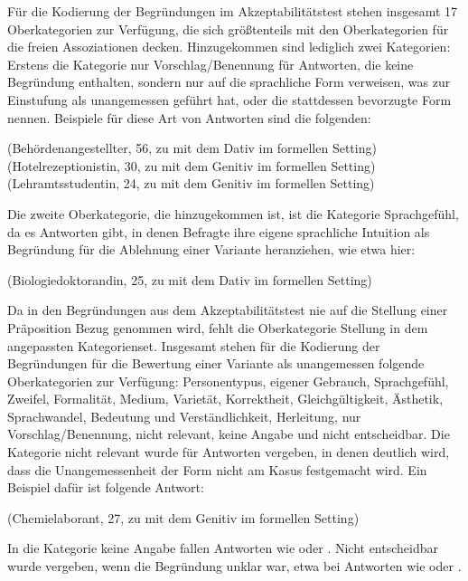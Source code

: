 Für die Kodierung der Begründungen im Akzeptabilitätstest stehen insgesamt 17 Oberkategorien zur Verfügung, die sich größtenteils mit den Oberkategorien für die freien Assoziationen decken. 
Hinzugekommen sind lediglich zwei Kategorien:
Erstens die Kategorie \glqq nur Vorschlag/Benennung\grqq{} für Antworten, die keine Begründung enthalten, sondern nur auf die sprachliche Form verweisen, was zur Einstufung als unangemessen geführt hat, oder die stattdessen bevorzugte Form nennen. 
Beispiele für diese Art von Antworten sind die folgenden: 
\begin{exe}
\ex {} (Behördenangestellter, 56, zu \waehrend{} mit dem Dativ im formellen Setting)
\ex {} (Hotelrezeptionistin, 30, zu \dank{} mit dem Genitiv im formellen Setting)
\ex {} (Lehramtsstudentin, 24, zu \gegenueber{} mit dem Genitiv im formellen Setting)
\end{exe}
Die zweite Oberkategorie, die hinzugekommen ist, ist die Kategorie \glqq Sprachgefühl\grqq, da es Antworten gibt, in denen Befragte ihre eigene sprachliche Intuition als Begründung für die Ablehnung einer Variante heranziehen, wie etwa hier:
\begin{exe}
\ex {} (Biologiedoktorandin, 25, zu \waehrend{} mit dem Dativ im formellen Setting)
\end{exe}
Da in den Begründungen aus dem Akzeptabilitätstest nie auf die Stellung einer Präposition Bezug genommen wird, fehlt die Oberkategorie \glqq Stellung\grqq{} in dem angepassten Kategorienset. 
Insgesamt stehen für die Kodierung der Begründungen für die Bewertung einer Variante als unangemessen folgende Oberkategorien zur Verfügung: \glqq Personentypus\grqq, \glqq eigener Gebrauch\grqq, \glqq Sprachgefühl\grqq, \glqq Zweifel\grqq, \glqq Formalität\grqq, \glqq Medium\grqq, \glqq Varietät\grqq, \glqq Korrektheit\grqq, \glqq Gleichgültigkeit\grqq, \glqq Ästhetik\grqq, \glqq Sprachwandel\grqq, \glqq Bedeutung und Verständlichkeit\grqq, \glqq Herleitung\grqq, \glqq nur Vorschlag/Benennung\grqq, \glqq nicht relevant\grqq, \glqq keine Angabe\grqq{} und \glqq nicht entscheidbar\grqq. 
Die Kategorie \glqq nicht relevant\grqq{} wurde für Antworten vergeben, in denen deutlich wird, dass die Unangemessenheit der Form nicht am Kasus festgemacht wird. 
Ein Beispiel dafür ist folgende Antwort: 
\begin{exe}
\ex {} (Chemielaborant, 27, zu \gegenueber{} mit dem Genitiv im formellen Setting)
\end{exe}
In die Kategorie \glqq keine Angabe\grqq{} fallen Antworten wie  oder . 
\glqq Nicht entscheidbar\grqq{} wurde vergeben, wenn die Begründung unklar war, etwa bei Antworten wie  oder . 

